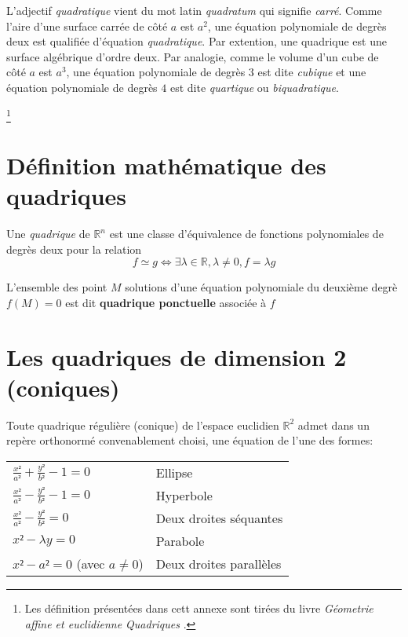 

L'adjectif \textit{quadratique} vient du mot latin  \textit{quadratum} qui signifie \textit{carré}. Comme l'aire d'une surface carrée de côté $a$ est $a^2$, une équation polynomiale de degrès deux est qualifiée d'équation \textit{quadratique}. Par extention, une quadrique est une surface algébrique d'ordre deux. Par analogie, comme le volume d'un cube de côté $a$ est $a^3$, une équation polynomiale de degrès $3$ est dite \textit{cubique} et une équation polynomiale de degrès $4$ est dite \textit{quartique} ou \textit{biquadratique}.

\footnote{Les définition présentées dans cett annexe sont tirées du livre \textit{Géometrie affine et euclidienne Quadriques} \cite{Vienne05}.}

\section{Définition mathématique des quadriques}

Une \textit{quadrique} de $\mathbb{R}^n$ est une classe d'équivalence de fonctions polynomiales de degrès deux pour la relation \[f \simeq g \Longleftrightarrow \exists \lambda \in \mathbb{R}, \lambda \neq 0, f = \lambda g\]

L'ensemble des point $M$ solutions d'une équation polynomiale du deuxième degrè $f(M)=0$ est dit \textbf{quadrique ponctuelle} associée à $f$


\section{Les quadriques de dimension 2 (coniques)}

Toute quadrique régulière (conique) de l'espace euclidien $\mathbb{R}^2$ admet dans un repère orthonormé convenablement choisi, une équation de l'une des formes:\\%

\begin{tabular}{l l}
 $\frac{x²}{a²}+\frac{y²}{b²}-1=0$ & Ellipse \\
 $\frac{x²}{a²}-\frac{y²}{b²}-1=0$ & Hyperbole \\
 $\frac{x²}{a²}-\frac{y²}{b²}=0$ & Deux droites séquantes \\
 $x²-\lambda y =0$ & Parabole \\
 $x² - a²=0$ (avec $a \neq 0$) & Deux droites parallèles 
\end{tabular}

